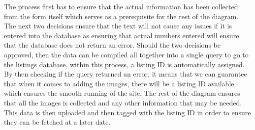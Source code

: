  The process first has to ensure that the actual information has been collected from the form itself which serves as a prerequisite for the rest of the diagram. The next two decisions ensure that the text will not cause any issues if it is entered into the database as ensuring that actual numbers entered will ensure that the database does not return an error. Should the two decisions be approved, then the data can be compiled all together into a single query to go to the listings database, within this process, a listing ID is automatically assigned. By then checking if the query returned an error, it means that we can guarantee that when it comes to adding the images, there will be a listing ID available which ensures the smooth running of the site. The rest of the diagram ensures that all the images is collected and any other information that may be needed. This data is then uploaded and then tagged with the listing ID in order to ensure they can be fetched at a later date. 

